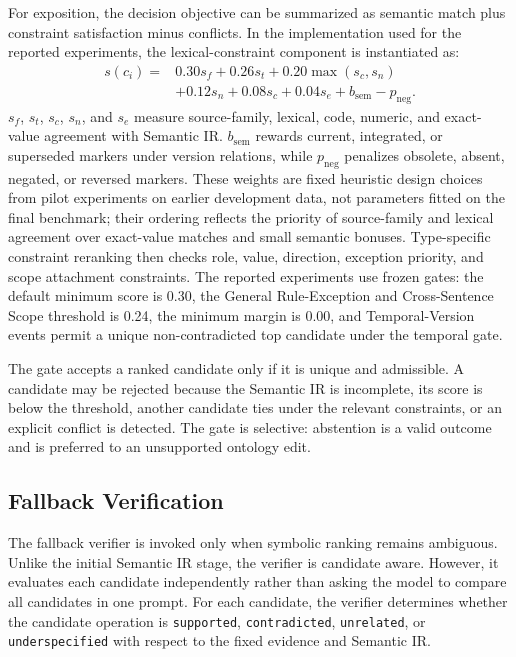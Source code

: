 \documentclass[conference]{IEEEtran}
\begin{document}
For exposition, the decision objective can be summarized as semantic match plus constraint satisfaction minus conflicts. In the implementation used for the reported experiments, the lexical-constraint component is instantiated as:
\[
\begin{aligned}
s(c_i)=&0.30s_f+0.26s_t+0.20\max(s_c,s_n)\\
&+0.12s_n+0.08s_c+0.04s_e+b_{\mathrm{sem}}-p_{\mathrm{neg}} .
\end{aligned}
\]
$s_f$, $s_t$, $s_c$, $s_n$, and $s_e$ measure source-family, lexical, code, numeric, and exact-value agreement with Semantic IR. $b_{\mathrm{sem}}$ rewards current, integrated, or superseded markers under version relations, while $p_{\mathrm{neg}}$ penalizes obsolete, absent, negated, or reversed markers. These weights are fixed heuristic design choices from pilot experiments on earlier development data, not parameters fitted on the final benchmark; their ordering reflects the priority of source-family and lexical agreement over exact-value matches and small semantic bonuses. Type-specific constraint reranking then checks role, value, direction, exception priority, and scope attachment constraints. The reported experiments use frozen gates: the default minimum score is 0.30, the General Rule-Exception and Cross-Sentence Scope threshold is 0.24, the minimum margin is 0.00, and Temporal-Version events permit a unique non-contradicted top candidate under the temporal gate.

The gate accepts a ranked candidate only if it is unique and admissible. A candidate may be rejected because the Semantic IR is incomplete, its score is below the threshold, another candidate ties under the relevant constraints, or an explicit conflict is detected. The gate is selective: abstention is a valid outcome and is preferred to an unsupported ontology edit.

\subsection{Fallback Verification}

The fallback verifier is invoked only when symbolic ranking remains ambiguous. Unlike the initial Semantic IR stage, the verifier is candidate aware. However, it evaluates each candidate independently rather than asking the model to compare all candidates in one prompt. For each candidate, the verifier determines whether the candidate operation is \texttt{supported}, \texttt{contradicted}, \texttt{unrelated}, or \texttt{underspecified} with respect to the fixed evidence and Semantic IR.
\end{document}
